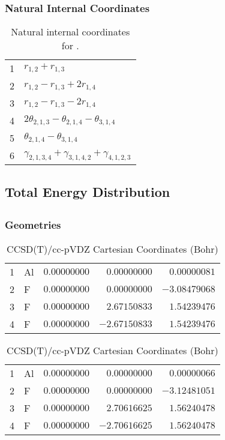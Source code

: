 \documentclass[10pt,oneside]{article}
\begin{document}
\begin{table}[h!]
\subsubsection*{Natural Internal Coordinates}
\centering
\caption{Natural internal coordinates for .}
\small
\begin{tabular}{ll}
\toprule
  1   & $r_{1,2} + r_{1,3}$ \\
  2   & $r_{1,2} - r_{1,3} + 2r_{1,4}$ \\
  3   & $r_{1,2} - r_{1,3} - 2r_{1,4}$ \\
  4   & $2\theta_{2,1,3} - \theta_{2,1,4} - \theta_{3,1,4}$ \\
  5   & $\theta_{2,1,4} - \theta_{3,1,4}$ \\
  6   & $\gamma_{2,1,3,4} + \gamma_{3,1,4,2} + \gamma_{4,1,2,3}$ \\
\bottomrule
\end{tabular}
\end{table}

\begin{table}
\subsection*{Total Energy Distribution}
\centering\end{table}

\clearpage

\subsection{}

\begin{table}[h!]
\subsubsection*{Geometries}
\begin{multicols}{2}
\centering
\caption{CCSD(T)/cc-pVTZ Cartesian Coordinates (Bohr)}
\begin{tabular}{llrrr}
\toprule
1  & Al & $ 0.00000000$ & $ 0.00000000$ & $ 0.00000081$ \\
2  & F  & $ 0.00000000$ & $ 0.00000000$ & $-3.08479068$ \\
3  & F  & $ 0.00000000$ & $ 2.67150833$ & $ 1.54239476$ \\
4  & F  & $ 0.00000000$ & $-2.67150833$ & $ 1.54239476$ \\
\bottomrule
\end{tabular}
\caption{CCSD(T)/cc-pVDZ Cartesian Coordinates (Bohr)}
\begin{tabular}{llrrr}
\toprule
1  & Al & $ 0.00000000$ & $ 0.00000000$ & $ 0.00000066$ \\
2  & F  & $ 0.00000000$ & $ 0.00000000$ & $-3.12481051$ \\
3  & F  & $ 0.00000000$ & $ 2.70616625$ & $ 1.56240478$ \\
4  & F  & $ 0.00000000$ & $-2.70616625$ & $ 1.56240478$ \\
\bottomrule
\end{tabular}
\end{multicols}
\end{table}
\end{document}
